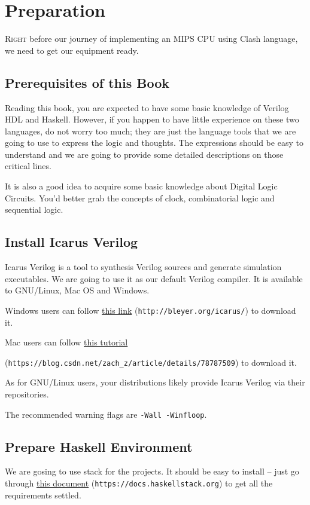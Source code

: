 \chapter{Preparation}
\lettrine{R}{ight} before our journey of implementing an MIPS CPU using Clash language, we need to get our equipment ready.
\section{Prerequisites of this Book}
Reading this book, you are expected to have some basic knowledge of Verilog HDL and Haskell. However, if you happen to have little experience on these two languages, do not worry too much; they are just the language tools that we are going to use to express the logic and thoughts. The expressions should be easy to understand and we are going to provide some detailed descriptions on those critical lines.   

It is also a good idea to acquire some basic knowledge about Digital Logic Circuits. You'd better grab the concepts of clock, combinatorial logic and sequential logic.
\section{Install Icarus Verilog}
Icarus Verilog is a tool to synthesis Verilog sources and generate simulation executables. We are going to use it as our default Verilog compiler. It is available to GNU/Linux, Mac OS and Windows.

Windows users can follow \href{http://bleyer.org/icarus/}{this link} (\texttt{http://bleyer.org/icarus/}) to download it.

Mac users can follow \href{https://blog.csdn.net/zach_z/article/details/78787509}{this tutorial}

(\texttt{https://blog.csdn.net/zach_z/article/details/78787509}) to download it.

As for GNU/Linux users, your distributions likely provide Icarus Verilog via their repositories.

The recommended warning flags are \texttt{-Wall -Winfloop}.
\section{Prepare Haskell Environment}
We are gosing to use stack for the projects. It should be easy to install -- just go through \href{https://docs.haskellstack.org}{this document} (\texttt{https://docs.haskellstack.org}) to get all the requirements settled. 

